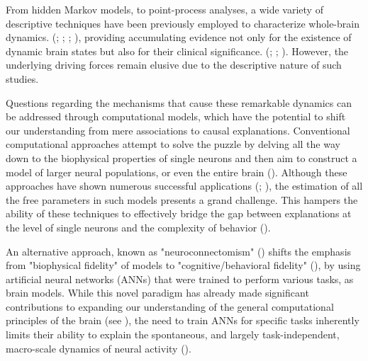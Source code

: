 \documentclass{article}
\begin{document}
From hidden Markov models, to point-process analyses, a wide variety of descriptive techniques have been previously employed to characterize whole-brain dynamics. (\cite{Smith_2012}; \cite{Vidaurre_2017}; \cite{Liu_2013}; \cite{Chen_2018}), providing accumulating evidence not only for the existence of dynamic brain states but also for their clinical significance. (\cite{Hutchison_2013}; \cite{Barttfeld_2015}; \cite{Meer_2020}).
However, the underlying driving forces remain elusive due to the descriptive nature of such studies.


Questions regarding the mechanisms that cause these remarkable dynamics can be addressed through computational models, which have the potential to shift our understanding from mere associations to causal explanations.
Conventional computational approaches attempt to solve the puzzle by delving all the way down to the biophysical properties of single neurons and then aim to construct a model of larger neural populations, or even the entire brain (\cite{Breakspear_2017}).
Although these approaches have shown numerous successful applications  (\cite{Kriegeskorte_2018}; \cite{Heinz_2018}), the estimation of all the free parameters in such models presents a grand challenge.
This hampers the ability of these techniques to effectively bridge the gap between explanations at the level of single neurons and the complexity of behavior (\cite{Breakspear_2017}).

An alternative approach, known as "neuroconnectomism" (\cite{Doerig_2023}) shifts the emphasis from "biophysical fidelity" of models to "cognitive/behavioral fidelity" (\cite{Kriegeskorte_2018}), by using artificial neural networks (ANNs) that were trained to perform various tasks, as brain models.
While this novel paradigm has already made significant contributions to expanding our understanding of the general computational principles of the brain (see \cite{Doerig_2023}), the need to train ANNs for specific tasks inherently limits their ability to explain the spontaneous, and largely task-independent, macro-scale dynamics of neural activity  (\cite{Richards_2019}).
\end{document}
